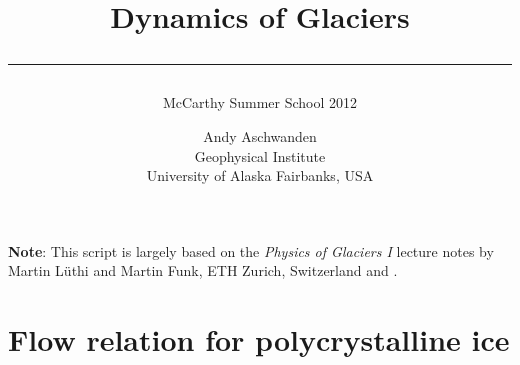 \documentclass[11pt,a4paper,halfparskip]{scrartcl}
\begin{document}
\title{Dynamics of Glaciers\\[.5em]
\rule[1.em]{\textwidth}{2pt}
\subtitle{McCarthy Summer School 2012}}

\date{}

\author{
  \small Andy Aschwanden\\[-.5em] 
  \small Geophysical Institute\\[-.5em] 
  \small University of Alaska Fairbanks, USA}


\maketitle

{\bf Note}: This script is largely based on the \emph{Physics of
Glaciers I} lecture notes by Martin L\"uthi and Martin Funk, ETH
Zurich, Switzerland and \cite{GreveBlatter_disg}.

\vspace{1em}

\section{Flow relation for polycrystalline ice}
\label{sec:flow-law-ice}
\end{document}

